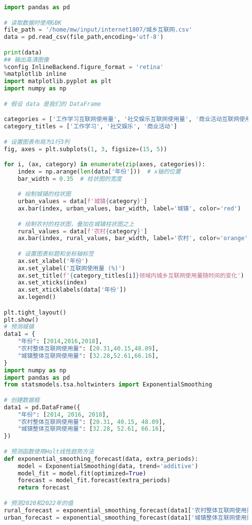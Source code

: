 \begin{lstlisting}[language=python,caption={城乡互联网}]
import pandas as pd

# 读取数据时使用GBK
file_path = '/home/mw/input/internet1807/城乡互联网.csv'
data = pd.read_csv(file_path,encoding='utf-8')

print(data)
## 输出高清图像
%config InlineBackend.figure_format = 'retina'
%matplotlib inline
import matplotlib.pyplot as plt
import numpy as np

# 假设 data 是我们的 DataFrame

categories = ['工作学习互联网使用量', '社交娱乐互联网使用量', '商业活动互联网使用量']
category_titles = ['工作学习', '社交娱乐', '商业活动']

# 设置图表布局为1行3列
fig, axes = plt.subplots(1, 3, figsize=(15, 5))

for i, (ax, category) in enumerate(zip(axes, categories)):
    index = np.arange(len(data['年份']))  # x轴的位置
    bar_width = 0.35  # 柱状图的宽度

    # 绘制城镇的柱状图
    urban_values = data[f'城镇{category}']
    ax.bar(index, urban_values, bar_width, label='城镇', color='red')

    # 绘制农村的柱状图，叠加在城镇柱状图之上
    rural_values = data[f'农村{category}']
    ax.bar(index, rural_values, bar_width, label='农村', color='orange', bottom=urban_values)

    # 设置图表标题和坐标轴标签
    ax.set_xlabel('年份')
    ax.set_ylabel('互联网使用量 (%)')
    ax.set_title(f'{category_titles[i]}领域内城乡互联网使用量随时间的变化')
    ax.set_xticks(index)
    ax.set_xticklabels(data['年份'])
    ax.legend()

plt.tight_layout()
plt.show()
# 预测城镇
data1 = {
    "年份": [2014,2016,2018],
    "农村整体互联网使用量": [20.31,40.15,48.09],
    "城镇整体互联网使用量": [32.28,52.61,66.16],
}
import numpy as np
import pandas as pd
from statsmodels.tsa.holtwinters import ExponentialSmoothing

# 创建数据框
data1 = pd.DataFrame({
    "年份": [2014, 2016, 2018],
    "农村整体互联网使用量": [20.31, 40.15, 48.09],
    "城镇整体互联网使用量": [32.28, 52.61, 66.16],
})

# 预测函数使用Holt线性趋势方法
def exponential_smoothing_forecast(data, extra_periods):
    model = ExponentialSmoothing(data, trend='additive')
    model_fit = model.fit(optimized=True)
    forecast = model_fit.forecast(extra_periods)
    return forecast

# 预测2020和2022年的值
rural_forecast = exponential_smoothing_forecast(data1['农村整体互联网使用量'], 2)
urban_forecast = exponential_smoothing_forecast(data1['城镇整体互联网使用量'], 2)


\end{lstlisting}
